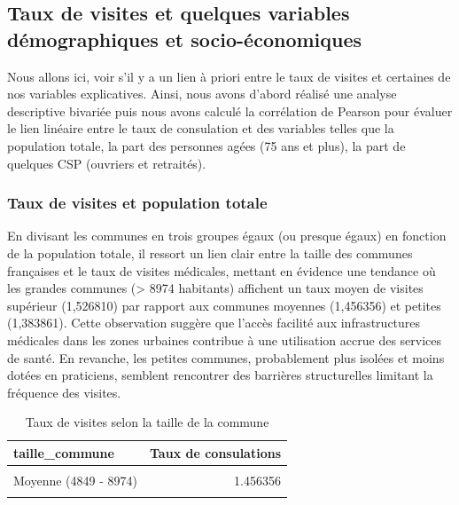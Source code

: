 \documentclass[
]{article}
\begin{document}
\hypertarget{taux-de-visites-et-quelques-variables-duxe9mographiques-et-socio-uxe9conomiques}{%
\subsection{Taux de visites et quelques variables démographiques et
socio-économiques}\label{taux-de-visites-et-quelques-variables-duxe9mographiques-et-socio-uxe9conomiques}}

Nous allons ici, voir s'il y a un lien à priori entre le taux de visites
et certaines de nos variables explicatives. Ainsi, nous avons d'abord
réalisé une analyse descriptive bivariée puis nous avons calculé la
corrélation de Pearson pour évaluer le lien linéaire entre le taux de
consulation et des variables telles que la population totale, la part
des personnes agées (75 ans et plus), la part de quelques CSP (ouvriers
et retraités).

\hypertarget{taux-de-visites-et-population-totale}{%
\subsubsection{Taux de visites et population
totale}\label{taux-de-visites-et-population-totale}}

En divisant les communes en trois groupes égaux (ou presque égaux) en
fonction de la population totale, il ressort un lien clair entre la
taille des communes françaises et le taux de visites médicales, mettant
en évidence une tendance où les grandes communes (\textgreater{} 8974
habitants) affichent un taux moyen de visites supérieur (1,526810) par
rapport aux communes moyennes (1,456356) et petites (1,383861). Cette
observation suggère que l'accès facilité aux infrastructures médicales
dans les zones urbaines contribue à une utilisation accrue des services
de santé. En revanche, les petites communes, probablement plus isolées
et moins dotées en praticiens, semblent rencontrer des barrières
structurelles limitant la fréquence des visites.

\begin{table}[H]
\centering
\caption{\label{tab:unnamed-chunk-21}Taux de visites selon la taille de la commune}
\centering
\begin{tabular}[t]{lr}
\toprule
taille\_commune & Taux de consulations\\
\midrule
\cellcolor{gray!10}{Grande (> 8974)} & \cellcolor{gray!10}{1.526810}\\
Moyenne (4849 - 8974) & 1.456356\\
\cellcolor{gray!10}{Petite (<= 4848)} & \cellcolor{gray!10}{1.383861}\\
\bottomrule
\end{tabular}
\end{table}
\end{document}

